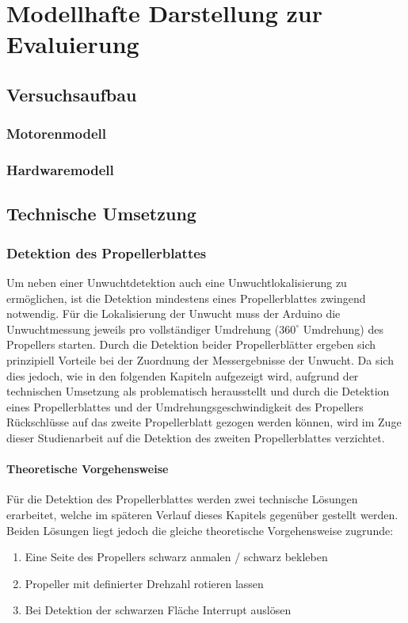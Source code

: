 
\chapter{Modellhafte Darstellung zur Evaluierung}

\section{Versuchsaufbau}

\subsection{Motorenmodell}

\subsection{Hardwaremodell}
\label{subsec:hardwaremodell}

\section{Technische Umsetzung}

\subsection{Detektion des Propellerblattes}
Um neben einer Unwuchtdetektion auch eine Unwuchtlokalisierung zu ermöglichen, ist die Detektion mindestens eines Propellerblattes zwingend notwendig.
Für die Lokalisierung der Unwucht muss der Arduino die Unwuchtmessung jeweils pro vollständiger Umdrehung ($360^\circ$ Umdrehung) des Propellers starten.
Durch die Detektion beider Propellerblätter ergeben sich prinzipiell Vorteile bei der Zuordnung der Messergebnisse der Unwucht. 
Da sich dies jedoch, wie in den folgenden Kapiteln aufgezeigt wird, aufgrund der technischen Umsetzung als problematisch herausstellt und durch die Detektion eines Propellerblattes und der Umdrehungsgeschwindigkeit des Propellers Rückschlüsse auf das zweite Propellerblatt gezogen werden können, wird im Zuge dieser Studienarbeit auf die Detektion des zweiten Propellerblattes verzichtet.

\subsubsection*{Theoretische Vorgehensweise}
Für die Detektion des Propellerblattes werden zwei technische Lösungen erarbeitet, welche im späteren Verlauf dieses Kapitels gegenüber gestellt werden.
Beiden Lösungen liegt jedoch die gleiche theoretische Vorgehensweise zugrunde:
\begin{enumerate}
	\item Eine Seite des Propellers schwarz anmalen / schwarz bekleben
	\item Propeller mit definierter Drehzahl rotieren lassen
	\item Bei Detektion der schwarzen Fläche Interrupt auslösen
\end{enumerate}



